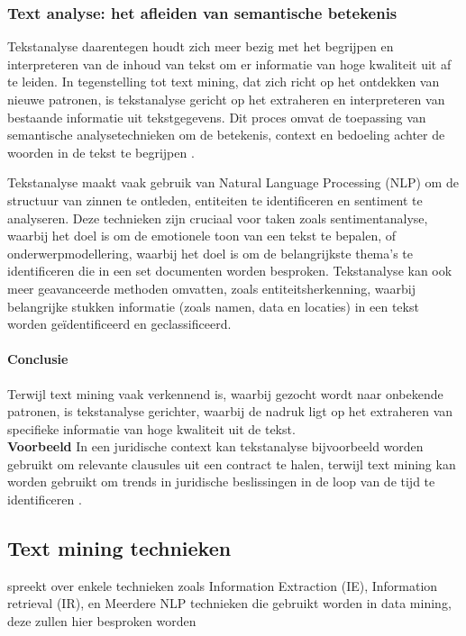 \subsubsection{Text analyse: het afleiden van semantische betekenis}
Tekstanalyse daarentegen houdt zich meer bezig met het begrijpen en interpreteren van de inhoud van tekst om er informatie van hoge kwaliteit uit af te leiden. In tegenstelling tot text mining, dat zich richt op het ontdekken van nieuwe patronen, is tekstanalyse gericht op het extraheren en interpreteren van bestaande informatie uit tekstgegevens. Dit proces omvat de toepassing van semantische analysetechnieken om de betekenis, context en bedoeling achter de woorden in de tekst te begrijpen \autocite{gaikwad2014text}.

Tekstanalyse maakt vaak gebruik van Natural Language Processing (NLP) om de structuur van zinnen te ontleden, entiteiten te identificeren en sentiment te analyseren. Deze technieken zijn cruciaal voor taken zoals sentimentanalyse, waarbij het doel is om de emotionele toon van een tekst te bepalen, of onderwerpmodellering, waarbij het doel is om de belangrijkste thema's te identificeren die in een set documenten worden besproken. Tekstanalyse kan ook meer geavanceerde methoden omvatten, zoals entiteitsherkenning, waarbij belangrijke stukken informatie (zoals namen, data en locaties) in een tekst worden geïdentificeerd en geclassificeerd.

\paragraph{Conclusie}
Terwijl text mining vaak verkennend is, waarbij gezocht wordt naar onbekende patronen, is tekstanalyse gerichter, waarbij de nadruk ligt op het extraheren van specifieke informatie van hoge kwaliteit uit de tekst. \\
\textbf{Voorbeeld} In een juridische context kan tekstanalyse bijvoorbeeld worden gebruikt om relevante clausules uit een contract te halen, terwijl text mining kan worden gebruikt om trends in juridische beslissingen in de loop van de tijd te identificeren \autocite{gaikwad2014text}.

\subsection{Text mining technieken}
\autocite{Talib2016TextMining} spreekt over enkele technieken zoals Information Extraction (IE), Information retrieval (IR), en Meerdere NLP technieken die gebruikt worden in data mining, deze zullen hier besproken worden


